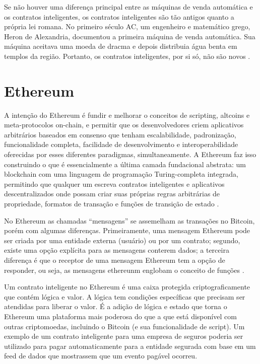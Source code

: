         Se não houver uma diferença principal entre as máquinas de venda automática e os contratos inteligentes, os contratos inteligentes são tão antigos quanto a própria lei romana. No primeiro século AC, um engenheiro e matemático grego, Heron de Alexandria, documentou a primeira máquina de venda automática. Sua máquina aceitava uma moeda de dracma e depois distribuia água benta em templos da região. Portanto, os contratos inteligentes, por si só, não são novos \cite{blockchain_pratical_guide}.
        



\section{Ethereum}


A intenção do Ethereum é fundir e melhorar o conceitos de scripting, altcoins e meta-protocolos on-chain, e permitir que os desenvolvedores criem aplicativos arbitrários baseados em consenso que tenham escalabilidade, padronização, funcionalidade completa, facilidade de desenvolvimento e interoperabilidade oferecidas por esses diferentes paradigmas, simultaneamente. A Ethereum faz isso construindo o que é essencialmente a última camada fundacional abstrata: um blockchain com uma linguagem de programação Turing-completa integrada, permitindo que qualquer um escreva contratos inteligentes e aplicativos descentralizados onde possam criar suas próprias regras arbitrárias de propriedade, formatos de transação e funções de transição de estado \cite{ethereum_white_paper}.

No Ethereum as chamadas “mensagens” se assemelham as transações no Bitcoin, porém com algumas diferenças. Primeiramente, uma mensagem Ethereum pode ser criada por uma entidade externa (usuário) ou por um contrato; segundo, existe uma opção explícita para as mensagens conterem dados; a terceira diferença é que o receptor de uma mensagem Ethereum tem a opção de responder, ou seja, as mensagens ethereunm englobam o conceito de funções \cite{ethereum_white_paper}.

Um contrato inteligente no Ethereum é uma caixa protegida criptograficamente que contém lógica e valor. A lógica tem condições específicas que precisam ser atendidas para liberar o valor. É a adição de lógica e estado que torna o Ethereum uma plataforma mais poderosa do que a que está disponível com outras criptomoedas, incluindo o Bitcoin (e sua funcionalidade de script). Um exemplo de um contrato inteligente para uma empresa de seguros poderia ser utilizado para pagar automaticamente para a entidade segurada com base em um feed de dados que mostrassem que um evento pagável ocorreu.\cite{blockchain_pratical_guide}

